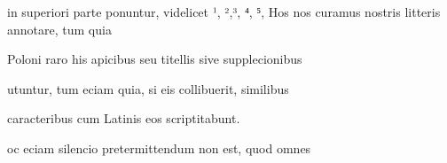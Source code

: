 






in superiori parte ponuntur, videlicet \colorbox{olive}{}¹, \colorbox{olive}{}²,\colorbox{olive}{}³, \colorbox{olive}{}⁴, \colorbox{olive}{}⁵,  Hos
nos curamus nostris litteris annotare, tum quia

Poloni raro his apicibus seu titellis sive supplecionibus

utuntur, tum eciam quia, si eis collibuerit, similibus

caracteribus cum Latinis eos scriptitabunt.

\indentP {}oc eciam silencio pretermittendum non est, quod omnes


